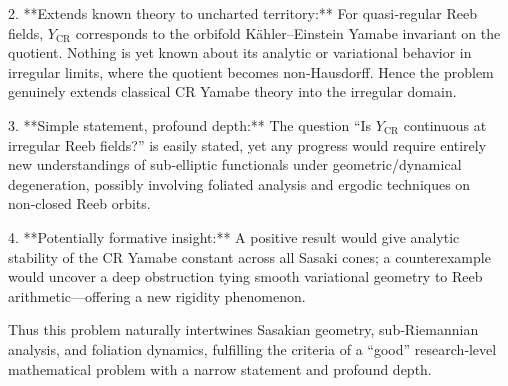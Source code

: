 2. **Extends known theory to uncharted territory:**  
   For quasi‑regular Reeb fields, \(Y_{\mathrm{CR}}\) corresponds to the orbifold Kähler–Einstein Yamabe invariant on the quotient. Nothing is yet known about its analytic or variational behavior in irregular limits, where the quotient becomes non‑Hausdorff. Hence the problem genuinely extends classical CR Yamabe theory into the irregular domain.

3. **Simple statement, profound depth:**  
   The question “Is \(Y_{\mathrm{CR}}\) continuous at irregular Reeb fields?” is easily stated, yet any progress would require entirely new understandings of sub‑elliptic functionals under geometric/dynamical degeneration, possibly involving foliated analysis and ergodic techniques on non‑closed Reeb orbits.

4. **Potentially formative insight:**  
   A positive result would give analytic stability of the CR Yamabe constant across all Sasaki cones; a counterexample would uncover a deep obstruction tying smooth variational geometry to Reeb arithmetic—offering a new rigidity phenomenon.

Thus this problem naturally intertwines Sasakian geometry, sub‑Riemannian analysis, and foliation dynamics, fulfilling the criteria of a “good” research‑level mathematical problem with a narrow statement and profound depth.
